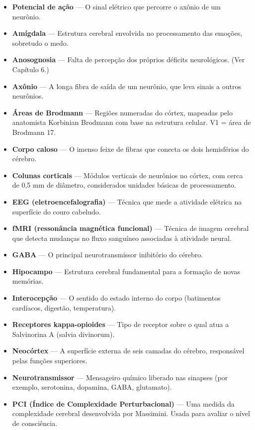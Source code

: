 \documentclass[11pt, twoside, openright]{book}
\begin{document}
\begin{itemize}
  \item \textbf{Potencial de ação} --- O sinal elétrico que percorre o axônio de um neurônio.
  \item \textbf{Amígdala} --- Estrutura cerebral envolvida no processamento das emoções, sobretudo o medo.
  \item \textbf{Anosognosia} --- Falta de percepção dos próprios déficits neurológicos. (Ver Capítulo 6.)
  \item \textbf{Axônio} --- A longa fibra de saída de um neurônio, que leva sinais a outros neurônios.
  \item \textbf{Áreas de Brodmann} --- Regiões numeradas do córtex, mapeadas pelo anatomista Korbinian Brodmann com base na estrutura celular. V1 = área de Brodmann 17.
  \item \textbf{Corpo caloso} --- O imenso feixe de fibras que conecta os dois hemisférios do cérebro.
  \item \textbf{Colunas corticais} --- Módulos verticais de neurônios no córtex, com cerca de 0,5 mm de diâmetro, considerados unidades básicas de processamento.
  \item \textbf{EEG (eletroencefalografia)} --- Técnica que mede a atividade elétrica na superfície do couro cabeludo.
  \item \textbf{fMRI (ressonância magnética funcional)} --- Técnica de imagem cerebral que detecta mudanças no fluxo sanguíneo associadas à atividade neural.
  \item \textbf{GABA} --- O principal neurotransmissor inibitório do cérebro.
  \item \textbf{Hipocampo} --- Estrutura cerebral fundamental para a formação de novas memórias.
  \item \textbf{Interocepção} --- O sentido do estado interno do corpo (batimentos cardíacos, digestão, temperatura).
  \item \textbf{Receptores kappa-opioides} --- Tipo de receptor sobre o qual atua a Salvinorina A (salvia divinorum).
  \item \textbf{Neocórtex} --- A superfície externa de seis camadas do cérebro, responsável pelas funções superiores.
  \item \textbf{Neurotransmissor} --- Mensageiro químico liberado nas sinapses (por exemplo, serotonina, dopamina, GABA, glutamato).
  \item \textbf{PCI (Índice de Complexidade Perturbacional)} --- Uma medida da complexidade cerebral desenvolvida por Massimini. Usada para avaliar o nível de consciência.

\end{itemize}
\end{document}
